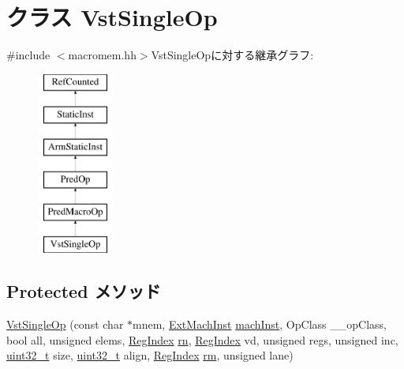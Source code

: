 \hypertarget{classArmISA_1_1VstSingleOp}{
\section{クラス VstSingleOp}
\label{classArmISA_1_1VstSingleOp}
}


{\ttfamily \#include $<$macromem.hh$>$}VstSingleOpに対する継承グラフ:\begin{figure}[H]
\begin{center}
\leavevmode
\includegraphics[height=6cm]{classArmISA_1_1VstSingleOp}
\end{center}
\end{figure}
\subsection*{Protected メソッド}
\begin{DoxyCompactItemize}
\item 
\hyperlink{classArmISA_1_1VstSingleOp_af0f9e5c15c10a709383bd04133330235}{VstSingleOp} (const char $\ast$mnem, \hyperlink{classStaticInst_a5605d4fc727eae9e595325c90c0ec108}{ExtMachInst} \hyperlink{classStaticInst_a744598b194ca3d4201d9414ce4cc4af4}{machInst}, OpClass \_\-\_\-opClass, bool all, unsigned elems, \hyperlink{classStaticInst_a36d25e03e43fa3bb4c5482cbefe5e0fb}{RegIndex} \hyperlink{namespaceArmISA_adf8c6c579ad8729095a637a4f2181211}{rn}, \hyperlink{classStaticInst_a36d25e03e43fa3bb4c5482cbefe5e0fb}{RegIndex} vd, unsigned regs, unsigned inc, \hyperlink{Type_8hh_a435d1572bf3f880d55459d9805097f62}{uint32\_\-t} size, \hyperlink{Type_8hh_a435d1572bf3f880d55459d9805097f62}{uint32\_\-t} align, \hyperlink{classStaticInst_a36d25e03e43fa3bb4c5482cbefe5e0fb}{RegIndex} \hyperlink{namespaceArmISA_ad546c2cf2168cf2d8ac21b2a9f485e82}{rm}, unsigned lane)
\end{DoxyCompactItemize}


